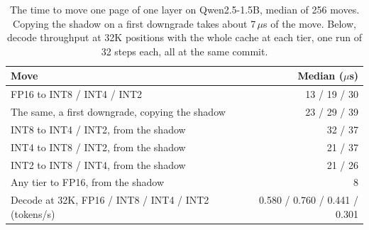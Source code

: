\documentclass{article}
\begin{document}
\begin{table}[h]
\caption{The time to move one page of one layer on Qwen2.5-1.5B, median of 256
moves. Copying the shadow on a first downgrade takes about 7\,$\mu$s of the
move. Below, decode throughput at 32K positions with the whole cache at each
tier, one run of 32 steps each, all at the same commit.}
\label{tab:moves}
\centering
\small
\begin{tabular}{lr}
\toprule
Move & Median ($\mu$s) \\
\midrule
FP16 to INT8 / INT4 / INT2 & 13 / 19 / 30 \\
The same, a first downgrade, copying the shadow & 23 / 29 / 39 \\
INT8 to INT4 / INT2, from the shadow & 32 / 37 \\
INT4 to INT8 / INT2, from the shadow & 21 / 37 \\
INT2 to INT8 / INT4, from the shadow & 21 / 26 \\
Any tier to FP16, from the shadow & 8 \\
\midrule
Decode at 32K, FP16 / INT8 / INT4 / INT2 (tokens/s) & 0.580 / 0.760 / 0.441 / 0.301 \\
\bottomrule
\end{tabular}
\end{table}

\newpage

\end{document}
